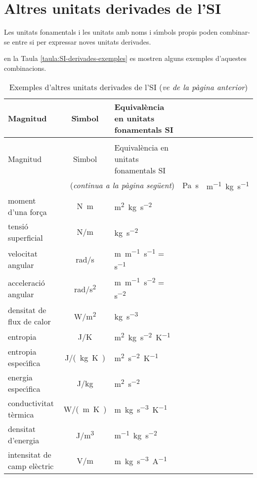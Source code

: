 \section{Altres unitats derivades de l'SI}

Les unitats fonamentals i les unitats amb noms i s\'{\i}mbols propis poden combinar-se entre si per expressar noves unitats derivades.

 en la Taula \vref{taula:SI-derivades-exemples} es mostren alguns exemples d'aquestes combinacions.

\begin{longtable}[h]{lcl}
   \caption{\label{taula:SI-derivades-exemples} Exemples d'altres unitats derivades de
   l'SI}\\
   \toprule[1pt]
    Magnitud &  S\'{\i}mbol & Equival\`{e}ncia en unitats fonamentals SI\\
   \midrule
   \endfirsthead
   \caption[]{Exemples d'altres unitats derivades de l'SI (\emph{ve de la p\`{a}gina
   anterior})}\\
   \toprule[1pt]
    Magnitud &  S\'{\i}mbol & Equival\`{e}ncia en unitats fonamentals SI\\
   \midrule
   \endhead
   \midrule
   \multicolumn{3}{r}{(\emph{continua a la p\`{a}gina seg\"{u}ent})}
   \endfoot
   \endlastfoot
   viscositat din\`{a}mica &  \si{Pa.s}& \si{m^{-1}.kg.s^{-1}} \\
   moment d'una for\c{c}a & \si{N.m} & \si{m^2.kg.s^{-2}} \\
   tensi\'{o} superficial &  \si{N/m} &   \si{kg.s^{-2}} \\
   velocitat angular & \si{rad/s} & \si{m.m^{-1}.s^{-1}} = \si{s^{-1}} \\
   acceleraci\'{o} angular & \si{rad/s^2} & \si{m.m^{-1}.s^{-2}} = \si{s^{-2}} \\
   densitat de flux de calor & \si{W/m^2} & \si{kg.s^{-3}} \\
   entropia & \si{J/K} & \si{m^2.kg.s^{-2}.K^{-1}} \\
   entropia espec\'{\i}fica & \si{J/(kg.K)} &\si{m^2.s^{-2}.K^{-1}} \\
   energia espec\'{\i}fica & \si{J/kg} & \si{m^2.s^{-2}} \\
   conductivitat t\`{e}rmica & \si{W/(m.K)} & \si{m.kg.s^{-3}.K^{-1}} \\
   densitat d'energia & \si{J/m^3} & \si{m^{-1}.kg.s^{-2}} \\
   intensitat de camp el\`{e}ctric & \si{V/m}& \si{m.kg.s^{-3}.A^{-1}}  \\

\end{longtable}
